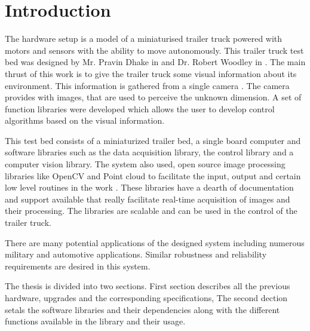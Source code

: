 
\chapter{Introduction}
\label{chap:introduction}

The hardware setup is a model of a miniaturised trailer truck powered with motors and sensors with the ability to move autonomously. This trailer truck test bed was designed by Mr. Pravin Dhake in \cite{dhake2007real}  and Dr. Robert Woodley in \cite{woodley1999testbed}.
The main thrust of this work is to give the trailer truck some visual information about its environment. This information is gathered from a single camera . The camera provides with images, that  are used to perceive the unknown dimension. A set of function libraries were developed which allows the user to develop control algorithms based on the visual information.

This test bed consists of a miniaturized trailer bed, a single board computer and software libraries such as the data acquisition library, the control library and a computer vision library.  The system also used, open source image processing libraries like OpenCV and Point cloud to facilitate the input, output and certain low level  routines in the work . These libraries have a dearth of documentation and support available that really facilitate real-time acquisition of images and their processing. The libraries are scalable and can be used in the control of the trailer truck.
 
There are many potential applications of the designed system including numerous military and automotive applications. Similar  robustness and reliability requirements are desired in this system.

The thesis is divided into two sections. First section describes all the previous hardware, upgrades and the corresponding specifications, The second dection setals the software libraries and their dependencies along with the  different functions available in the library and their usage.